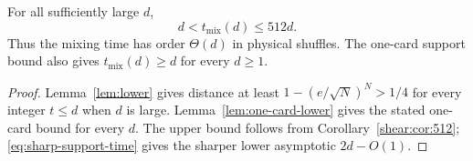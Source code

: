 \begin{corollary}
\label{shear:cor:order}
For all sufficiently large \(d\),
\[
 d<t_{\mathrm{mix}}(d)\le512d.
\]
Thus the mixing time has order \(\Theta(d)\) in physical shuffles.
The one-card support bound also gives \(t_{\mathrm{mix}}(d)\ge d\)
for every \(d\ge1\).
\end{corollary}
\begin{proof}
Lemma~\ref{lem:lower} gives distance at least
\(1-(e/\sqrt N)^N>1/4\) for every integer \(t\le d\) when \(d\) is
large. Lemma~\ref{lem:one-card-lower} gives the stated one-card bound
for every \(d\). The upper bound follows from
Corollary~\ref{shear:cor:512}; \eqref{eq:sharp-support-time} gives
the sharper lower asymptotic \(2d-O(1)\).
\end{proof}
